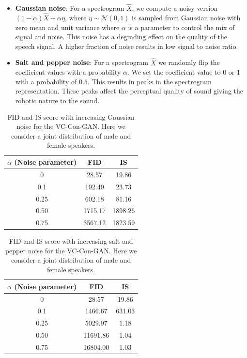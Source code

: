 \begin{itemize}
    \item \textbf{Gaussian noise}: For a spectrogram $\hat{X}$, we compute a noisy version $(1-\alpha) \hat{X} + \alpha \eta$, where $\eta\sim \mathcal{N}(0,1)$ is sampled from Gaussian noise with zero mean and unit variance where $\alpha$ is a parameter to control the mix of signal and noise. This noise has a degrading effect on the quality of the speech signal. A higher fraction of noise results in low signal to noise ratio.

    \item \textbf{Salt and pepper noise}: For a spectrogram $\hat{X}$ we randomly flip the coefficient values with a probability $\alpha$. We set the coefficient value to $0$ or $1$ with a probability of $0.5$. This results in peaks in the spectrogram representation. These peaks affect the perceptual quality of sound giving the robotic nature to the sound. 
\end{itemize}

    \begin{table}[h]
    \centering
    \begin{tabular}{ccc}
    \toprule
    $\alpha$ (Noise parameter) & \textbf{FID} & \textbf{IS}\\
    \midrule
    0     &  28.57& 19.86\\
    0.1     & 192.49& 23.73\\
    0.25&  602.18 & 81.16\\
    0.50 & 1715.17& 1898.26\\
    0.75 & 3567.12& 1823.59\\
    \bottomrule 
    \end{tabular}
    \caption[Robustness of the FID and IS score to Gaussian Noise]{FID and IS score with increasing Gaussian noise for the VC-Con-GAN. Here we consider a joint distribution of male and female speakers.}
    \label{tab:qualt_gn}
\end{table}

\begin{table}[h]
    \centering
    \begin{tabular}{ccc}
    \toprule
    $\alpha$ (Noise parameter) & \textbf{FID} & \textbf{IS}\\
    \midrule
       0  &  28.57& 19.86\\
       0.1 & 1466.67 & 631.03\\
       0.25 &5029.97 & 1.18\\
       0.50 &11691.86 & 1.04\\
       0.75 &16804.00 & 1.03\\
     \bottomrule  
    \end{tabular}
    \caption[Robustness of the FID and IS score to salt and pepper noise]{FID and IS score with increasing salt and pepper noise for the VC-Con-GAN. Here we consider a joint distribution of male and female speakers.}
    \label{tab:qualt_sp}
   \end{table}


